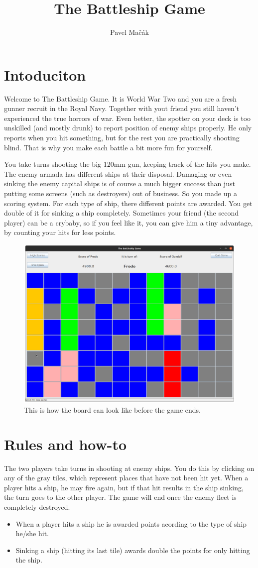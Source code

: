 \documentclass[]{article}
\title{The Battleship Game}
\author{Pavel Mačák}
\begin{document}
\maketitle

\section{Intoduciton}

Welcome to The Battleship Game. It is World War Two and you are a fresh gunner recruit in the Royal Navy. Together with yout friend you still haven't experienced the true horrors of war. Even better, the spotter on your deck is too unskilled (and mostly drunk) to report position of enemy ships properly. He only reports when you hit something, but for the rest you are practically shooting blind. That is why you make each battle a bit more fun for yourself.

You take turns shooting the big 120mm gun, keeping track of the hits you make. The enemy armada has different ships at their disposal. Damaging or even sinking the enemy capital ships is of course a much bigger success than just putting some screens (such as destroyers) out of business. So you made up a scoring system. For each type of ship, there different points are awarded. You get double of it for sinking a ship completely. Sometimes your friend (the second player) can be a crybaby, so if you feel like it, you can give him a tiny advantage, by counting your hits for less points.


\begin{figure}
	\centering
	\includegraphics[width=0.5\linewidth]{figs/boardScreen}
	\caption{This is how the board can look like before the game ends.}
	\label{fig:boardscreen}
\end{figure}

\section{Rules and how-to}
The two players take turns in shooting at enemy ships. You do this by clicking on any of the gray tiles, which represent places that have not been hit yet. When a player hits a ship, he may fire again, but if that hit results in the ship sinking, the turn goes to the other player. The game will end once the enemy fleet is completely destroyed.
\begin{itemize}
	\item When a player hits a ship he is awarded points acording to the type of ship he/she hit.
	\item Sinking a ship (hitting its last tile) awards double the points for only hitting the ship.
\end{itemize}
\end{document}
